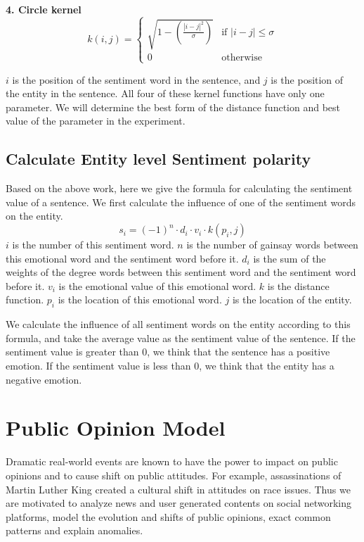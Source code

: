 \documentclass[runningheads]{llncs}
\begin{document}
\textbf{4. Circle kernel}
\begin{equation}
k(i,j)=\begin{cases}
\sqrt{1-\left(\frac{|i-j|^2}{\sigma}\right)} &\mbox{if $|i-j|\leq \sigma$}\\
0 &\mbox{otherwise}
\end{cases}
\end{equation}

$i$ is the position of the sentiment word in the sentence, and $j$ is the position of the entity in the sentence. All four of these kernel functions have only one parameter. We will determine the best form of the distance function and best value of the parameter in the experiment.

\subsection{Calculate Entity level Sentiment polarity}
Based on the above work, here we give the formula for calculating the sentiment value of a sentence. We first calculate the influence of one of the sentiment words on the entity.
\begin{equation}
    s_i = (-1)^n\cdot d_i\cdot v_i\cdot k(p_i,j)
\end{equation}
$i$ is the number of this sentiment word. $n$ is the number of gainsay words between this emotional word and the sentiment word before it. $d_i$ is the sum of the weights of the degree words between this sentiment word and the sentiment word before it. $v_i$ is the emotional value of this emotional word. $k$ is the distance function. $p_i$ is the location of this emotional word. $j$ is the location of the entity.

We calculate the influence of all sentiment words on the entity according to this formula, and take the average value as the sentiment value of the sentence. If the sentiment value is greater than 0, we think that the sentence has a positive emotion. If the sentiment value is less than 0, we think that the entity has a negative emotion.

\section{Public Opinion Model}\label{sec:public opinion model}
Dramatic real-world events are known to have the power to impact on public opinions and to cause shift on public attitudes. For example, assassinations of Martin Luther King created a cultural shift in attitudes on race issues. Thus we are motivated to analyze news and user generated contents on social networking platforms, model the evolution and shifts of public opinions,  exact common patterns and explain anomalies.
\end{document}
